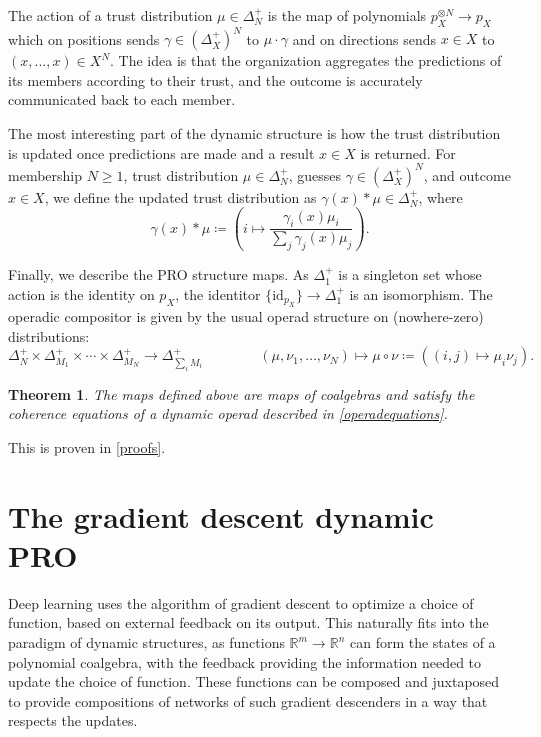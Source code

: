 \documentclass[11pt, one side, article]{memoir}
\theoremstyle{definition}
\theoremstyle{plain}
\newtheorem{theorem}[definitionx]{Theorem}
\newcommand{\id}{\mathrm{id}}
\newcommand{\rr}{\mathbb{R}}
\newcommand{\0}{\textsf{0}}
\newcommand{\1}{\tn{\textsf{1}}}
\newcommand{\bet}{\Delta^+}
\begin{document}
The action of a trust distribution $\mu \in \Delta^+_N$ is the map of polynomials $p_X^{\otimes N} \to p_X$ which on positions sends $\gamma \in (\bet_X)^N$ to $\mu \cdot \gamma$ and on directions sends $x \in X$ to $(x,...,x) \in X^N$. The idea is that the organization aggregates the predictions of its members according to their trust, and the outcome is accurately communicated back to each member.

The most interesting part of the dynamic structure is how the trust distribution is updated once predictions are made and a result $x\in X$ is returned. For membership $N\geq 1$, trust distribution $\mu\in\Delta^+_N$, guesses $\gamma\in(\bet_X)^N$, and outcome $x\in X$, we define the updated trust distribution as $\gamma(x) * \mu \in\Delta^+_N$, where
\[
\gamma(x) * \mu \coloneqq \left( i \mapsto \frac{\gamma_i(x)\mu_i}{\sum_j \gamma_j(x)\mu_j}\right).
\]

Finally, we describe the PRO structure maps. As $\Delta^+_1$ is a singleton set whose action is the identity on $p_X$, the identitor $\{\id_{p_X}\} \to \Delta^+_1$ is an isomorphism. The operadic compositor is given by the usual operad structure on (nowhere-zero) distributions:
\[
\Delta^+_N \times \Delta^+_{M_1} \times \cdots \times \Delta^+_{M_N} \to \Delta^+_{\sum_i M_i} \qquad\qquad (\mu,\nu_1,\ldots,\nu_N) \mapsto \mu \circ \nu \coloneqq \left( (i,j) \mapsto \mu_i\nu_j \right).
\]

\begin{theorem}\label{predictionadaptive}
The maps defined above are maps of coalgebras and satisfy the coherence equations of a dynamic operad described in \cref{operadequations}.
\end{theorem}

This is proven in \cref{proofs}.

\section{The gradient descent dynamic PRO}

Deep learning uses the algorithm of gradient descent to optimize a choice of function, based on external feedback on its output. This naturally fits into the paradigm of dynamic structures, as functions $\rr^m \to \rr^n$ can form the states of a polynomial coalgebra, with the feedback providing the information needed to update the choice of function. These functions can be composed and juxtaposed to provide compositions of networks of such gradient descenders in a way that respects the updates.
\end{document}
